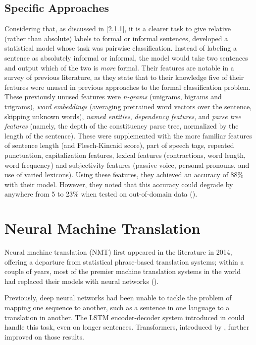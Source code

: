 \subsection{Specific Approaches}

Considering that, as discussed in \ref{2.1.1}, it is a clearer task to give relative (rather than absolute) labels to formal or informal sentences, \cite{pavlick2016empirical} developed a statistical model whose task was pairwise classification. Instead of labeling a sentence as absolutely informal or informal, the model would take two sentences and output which of the two is \textit{more} formal. Their features are notable in a survey of previous literature, as they state that to their knowledge five of their features were unused in previous approaches to the formal classification problem. These previously unused features were \textit{n-grams} (unigrams, bigrams and trigrams), \textit{word embeddings} (averaging pretrained word vectors over the sentence, skipping unknown words), \textit{named entities}, \textit{dependency features}, and \textit{parse tree features} (namely, the depth of the constituency parse tree, normalized by the length of the sentence). These were supplemented with the more familiar features of sentence length (and Flesch-Kincaid score), part of speech tags, repeated punctuation, capitalization features, lexical features (contractions, word length, word frequency) and subjectivity features (passive voice, personal pronouns, and use of varied lexicons). Using these features, they achieved an accuracy of 88\% with their model. However, they noted that this accuracy could degrade by anywhere from 5 to 23\% when tested on out-of-domain data (\cite{pavlick2016empirical}).

\section{Neural Machine Translation}

Neural machine translation (NMT) first appeared in the literature in 2014, offering a departure from statistical phrase-based translation systems; within a couple of years, most of the premier machine translation systems in the world had replaced their models with neural networks (\cite{sutskever2014sequence}). 

Previously, deep neural networks had been unable to tackle the problem of mapping one sequence to another, such as a sentence in one language to a translation in another. The LSTM encoder-decoder system introduced in \cite{sutskever2014sequence} could handle this task, even on longer sentences. Transformers, introduced by \cite{vaswani2018attention}, further improved on those results.

